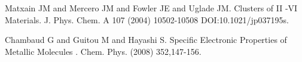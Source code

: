 
\begin{thebibliography}{10}

{\sc Matxain JM and Mercero JM and Fowler JE and Uglade JM}. {Clusters of II -VI Materials}. J. Phys. Chem. A 107 (2004) 10502-10508 DOI:10.1021/jp037195s.



{\sc Chambaud G and Guitou M and Hayashi S}. {Specific Electronic Properties of Metallic Molecules }. Chem. Phys. (2008) 352,147-156.

\end{thebibliography}
